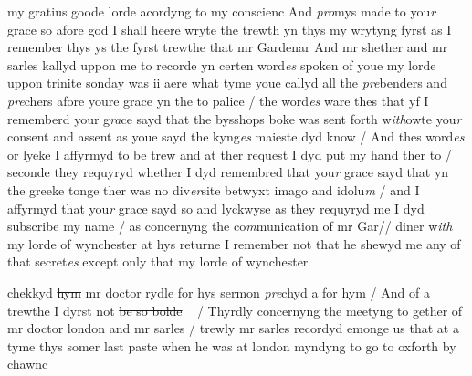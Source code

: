 \documentclass[12pt, a4paper]{book}
\begin{document}
		\ifthenelse{\isodd{\thepage}}
		{\reversemarginpar}
		{\normalmarginpar}
		my gratius goode lorde acordyng to my conscienc And\textit{ pro}mys made to you\textit{r }grace
so afore god I shall heere wryte the trewth yn thys my wrytyng
fyrst as I remember thys ys the fyrst trewthe that mr Gardenar And
mr shether and mr sarles kallyd uppon me to recorde yn certen word\textit{es} spoken
of youe 
			my lorde uppon trinite sonday was ii aere what tyme youe callyd all the
\textit{pre}benders and \textit{pre}chers afore youre grace yn the to 
			palice / the word\textit{es} ware thes
that yf I rememberd your g\textit{ra}ce sayd that the bysshops boke was sent forth
w\textit{ith}owte you\textit{r} consent and assent
			 as youe sayd the kyng\textit{es} maieste dyd know /
And thes word\textit{es} or lyeke I affyrmyd to be trew and at ther request I dyd put
my hand ther to / seconde they requyryd whether I \sout{dyd }remembred that you\textit{r}
grace sayd that yn the greeke tonge ther was no div\textit{er}site betwyxt imago and
idolu\textit{m} / and I affyrmyd that you\textit{r} grace sayd so and lyckwyse as they requyryd
me I dyd subscribe my name / as concernyng the co\textit{m}munication of mr Gar//
diner w\textit{ith} my lorde of wynchester at hys returne I remember not that 
he shewyd me any of that secret\textit{es} except only that my lorde of wynchester
            		
				\marginpar[\vspace{0.5cm}{\textcolor{Gray}{so bolde to macke request of such secret communication  as were bytwyxt my lorde of Winchester and mr gardener at that tyme}}]{}
			
            		
		\ifthenelse{\isodd{\thepage}}
		{\reversemarginpar}
		{\normalmarginpar}
		chekkyd \sout{hym }
               mr doctor rydle
			 for hys sermon \textit{pre}chyd a for hym / And of a trewthe I dyrst not
            		\sout{be so bolde}
                 / Thyrdly concernyng the meetyng to gether of mr doctor london 
and mr sarles / trewly mr sarles recordyd emonge us that at a tyme thys
somer last paste when he was at london myndyng to go to oxforth by chawnc
			
\end{document}
